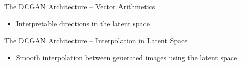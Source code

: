 \begin{frame}{The DCGAN Architecture -- Vector Arithmetics}
\protect\hypertarget{the-dcgan-architecture-vector-arithmetics}{}

\begin{itemize}
\tightlist
\item
  Interpretable directions in the latent space
\end{itemize}


\end{frame}

\begin{frame}{The DCGAN Architecture -- Interpolation in Latent Space}
\protect\hypertarget{the-dcgan-architecture-interpolation-in-latent-space}{}

\begin{itemize}
\tightlist
\item
  Smooth interpolation between generated images using the latent space
\end{itemize}



\end{frame}


